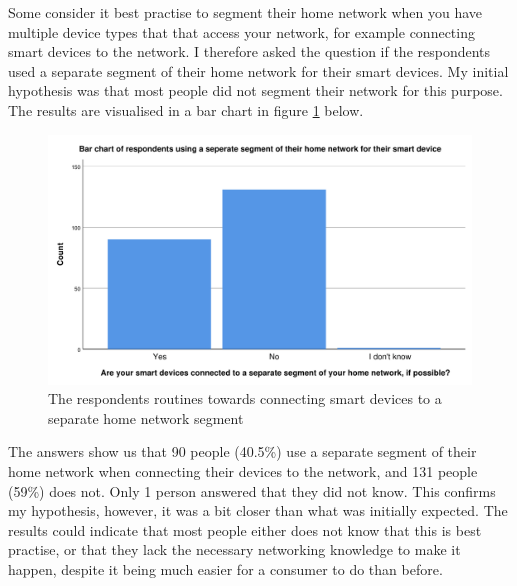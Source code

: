 Some \cite{ENISA2015SmartHome} consider it best practise to segment their home network when you have multiple device types that that access your network, for example connecting smart devices to the network. I therefore asked the question if the respondents used a separate segment of their home network for their smart devices. My initial hypothesis was that most people did not segment their network for this purpose. The results are visualised in a bar chart in figure \ref{fig:separat_segment} below. 
\begin{figure}[!h]
    \centering
    \includegraphics[scale=0.55]{figures/diagrams/separat_segment.pdf}
    \caption{The respondents routines towards connecting smart devices to a separate home network segment}
    \label{fig:separat_segment}
\end{figure}
The answers show us that 90 people (40.5\%) use a separate segment of their home network when connecting their devices to the network, and 131 people (59\%) does not. Only 1 person answered that they did not know. This confirms my hypothesis, however, it was a bit closer than what was initially expected. The results could indicate that most people either does not know that this is best practise, or that they lack the necessary networking knowledge to make it happen, despite it being much easier for a consumer to do than before. 

